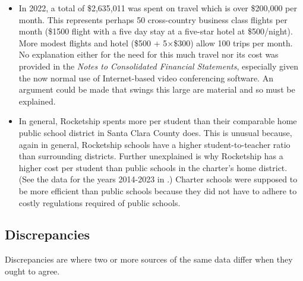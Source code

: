 \begin{itemize}
  \item In 2022, a total of \$2,635,011 was spent on travel which is over \$200,000 per month. This represents perhaps 50 cross-country business class flights per month (\$1500 flight with a five day stay at a five-star hotel at \$500/night).  More modest flights and hotel (\$500 + 5×\$300) allow 100 trips per month.  No explanation either for the need for this much travel nor its cost was provided in the \textit{Notes to Consolidated Financial Statements}, especially given the now normal use of Internet-based video conferencing software. An argument could be made that swings this large are material and so must be explained.
  
  \item In general, Rocketship spents more per student than their comparable home public school district in Santa Clara County does. This is unusual because, again in general, Rocketship schools have a higher student-to-teacher ratio than surrounding districts. Further unexplained is why Rocketship has a higher cost per student than public schools in the charter's home district. (See the data for the years 2014-2023 in \textcite{SCCOE2014}.) Charter schools were supposed to be more efficient than public schools because they did not have to adhere to costly regulations required of public schools.
\end{itemize}

\subsection{Discrepancies}%
\label{sec:discrepancies}\indent%

Discrepancies are where two or more sources of the same data differ when they ought to agree.

